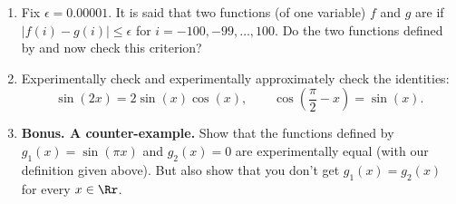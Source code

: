 \documentclass[11pt,class=report,crop=false]{standalone}
\begin{document}
\begin{activite}
\begin{enumerate}
\begin{enumerate}
    \item Fix $\epsilon = 0.00001$. It is said that two functions (of one variable) $f$ and $g$ are  if $|f(i)-g(i)| \le \epsilon$ for $i=-100,-99,\ldots,100$. Do the two functions defined by  and  now check this criterion?
    
    \item Experimentally check and experimentally approximately check the identities:
    $$\sin(2x) = 2\sin(x)\cos(x), \qquad \cos\left(\frac\pi2-x\right)=\sin(x).$$

  
  \item \textbf{Bonus. A counter-example.}
  Show that the functions defined by $g_1(x) = \sin(\pi x)$ and $g_2(x)=0$ are experimentally equal (with our definition given above). But also show that you don't get $g_1(x) = g_2(x)$ for every $x\in\Rr$.
  
  \end{enumerate} 
\end{enumerate}

\end{activite}
\end{document}
